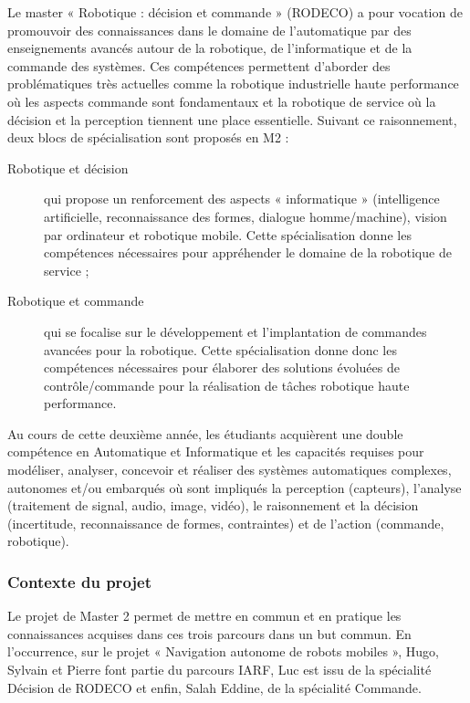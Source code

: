 \documentclass[10pt,a4paper]{article}
\begin{document}
Le master « Robotique : décision et commande » (RODECO) a pour vocation de promouvoir des connaissances dans le domaine de l’automatique par des enseignements avancés autour de la robotique, de l’informatique et de la commande des systèmes. Ces compétences permettent d’aborder des problématiques très actuelles comme la robotique industrielle haute performance où les aspects commande sont fondamentaux et la robotique  de service où la décision et la perception tiennent une place essentielle. Suivant ce raisonnement, deux blocs de spécialisation sont proposés en M2 : 

\begin{description}
\item [Robotique et décision] qui propose un renforcement des aspects « informatique » (intelligence artificielle, reconnaissance des formes, dialogue homme/machine), vision par ordinateur et robotique  mobile. Cette spécialisation donne les compétences nécessaires pour appréhender le domaine de la robotique de service ;
\item [Robotique et commande] qui se focalise sur le développement et l’implantation de commandes avancées pour la robotique. Cette spécialisation donne donc les compétences nécessaires pour élaborer des solutions évoluées de contrôle/commande pour la réalisation de tâches robotique haute performance.
\end{description}

Au cours de cette deuxième année, les étudiants acquièrent une double compétence en Automatique et Informatique et les capacités requises pour modéliser, analyser, concevoir et réaliser des systèmes automatiques complexes, autonomes et/ou embarqués où sont impliqués la perception (capteurs), l’analyse (traitement de signal, audio, image, vidéo), le raisonnement et la décision (incertitude, reconnaissance de formes, contraintes) et de l’action (commande, robotique).
  
\subsubsection{Contexte du projet}

Le projet de Master 2 permet de mettre en commun et en pratique les connaissances acquises dans ces trois parcours dans un but commun. En l’occurrence, sur le projet « Navigation autonome de robots mobiles », Hugo, Sylvain et Pierre font partie du parcours IARF, Luc est issu de la spécialité Décision de RODECO et enfin, Salah Eddine, de la spécialité Commande.
\end{document}
